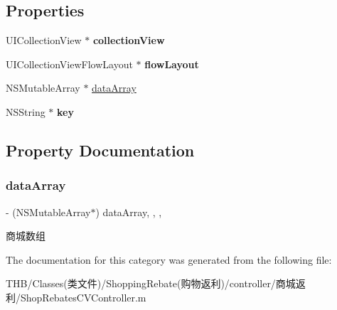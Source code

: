 \subsection*{Properties}
\begin{DoxyCompactItemize}
\item 
\mbox{\label{category_shop_rebates_c_v_controller_07_08_ad6b07d0725cb0d0393da34960506e026}} 
U\+I\+Collection\+View $\ast$ {\bfseries collection\+View}
\item 
\mbox{\label{category_shop_rebates_c_v_controller_07_08_ae498877b4e0161d9d968e7b79cf54e44}} 
U\+I\+Collection\+View\+Flow\+Layout $\ast$ {\bfseries flow\+Layout}
\item 
N\+S\+Mutable\+Array $\ast$ \mbox{\hyperlink{category_shop_rebates_c_v_controller_07_08_aa3b45c0e56dc8da7ad254375f5758660}{data\+Array}}
\item 
\mbox{\label{category_shop_rebates_c_v_controller_07_08_a5deaa858bd2537752c482c762ba9020a}} 
N\+S\+String $\ast$ {\bfseries key}
\end{DoxyCompactItemize}


\subsection{Property Documentation}
\mbox{\label{category_shop_rebates_c_v_controller_07_08_aa3b45c0e56dc8da7ad254375f5758660}} 
\subsubsection{\texorpdfstring{data\+Array}{dataArray}}
{\footnotesize\ttfamily -\/ (N\+S\+Mutable\+Array$\ast$) data\+Array\hspace{0.3cm}{\ttfamily [read]}, {\ttfamily [write]}, {\ttfamily [nonatomic]}, {\ttfamily [strong]}}

商城数组 

The documentation for this category was generated from the following file\+:\begin{DoxyCompactItemize}
\item 
T\+H\+B/\+Classes(类文件)/\+Shopping\+Rebate(购物返利)/controller/商城返利/Shop\+Rebates\+C\+V\+Controller.\+m\end{DoxyCompactItemize}

